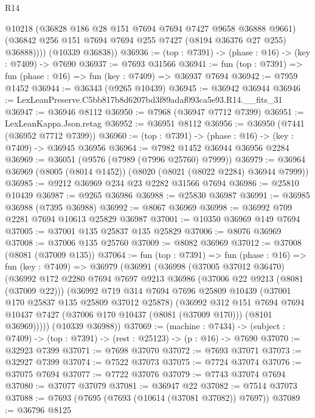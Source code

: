 \begin{lexlean}{R14}
\begin{coremodule}
            @10218
            (@36828 @186 @28 @151 @7694 @7694 @7427 @9658 @36888 @9661)
            (@36842 @256 @151 @7694 @7694 @255 @7427 (@8194 @36376 @27 @255) @36888))))
      (@10339 @36838))
@36936 := (top : @7391) -> (phase : @16) -> (key : @7409) -> @7690
@36937 := @7693 @31566
@36941 := fun (top : @7391) => fun (phase : @16) => fun (key : @7409) => @36937 @7694
@36942 := @7959 @1452
@36944 := @36343 (@9265 @10439)
@36945 := @36942 @36944
@36946 := LexLeanPreserve.C5bb817b8d6207bd3f89adaf093ca5e93.R14.__fits_31
@36947 := @36946 @8112
@36950 := @7968 (@36947 @7712 @7399)
@36951 := LexLeanKappa.Json.retag
@36952 := @36951 @8112
@36956 := @36950 (@7441 (@36952 @7712 @7399))
@36960 := (top : @7391) -> (phase : @16) -> (key : @7409) -> @36945 @36956
@36964 := @7982 @1452 @36944 @36956 @2284
@36969 := @36051 (@9576 (@7989 (@7996 @25760) @7999))
@36979 := @36964 @36969 (@8005 (@8014 @1452)) (@8020 (@8021 (@8022 @2284) @36944 @7999))
@36985 := @9212 @36969 @234 @23 @2282 @31566 @7694
@36986 := @25810 @10439
@36987 := @9265 @36986
@36988 := @25830 @36987
@36991 := @36985 @36988 (@7395 @36988)
@36992 := @8067 @36969
@36998 := @36992 @709 @2281 @7694 @10613 @25829 @36987
@37001 := @10350 @36969 @149 @7694
@37005 := @37001 @135 @25837 @135 @25829
@37006 := @8076 @36969
@37008 := @37006 @135 @25760
@37009 := @8082 @36969
@37012 := @37008 (@8081 (@37009 @135))
@37064 := fun (top : @7391) =>
  fun (phase : @16) =>
  fun (key : @7409) =>
  @36979
    (@36991
      (@36998
        (@37005 @37012 @36470)
        (@36992
          @172
          @2280
          @7694
          @7697
          @9213
          @36986
          (@37006 @22 @9213 (@8081 (@37009 @22)))
          (@36992
            @719
            @314
            @7694
            @7696
            @25809
            @10439
            (@37001 @170 @25837 @135 @25809 @37012 @25878)
            (@36992
              @312
              @151
              @7694
              @7694
              @10437
              @7427
              (@37006 @170 @10437 (@8081 (@37009 @170)))
              (@8101 @36969)))))
      (@10339 @36988))
@37069 := (machine : @7434) ->
  (subject : @7409) -> (top : @7391) -> (rest : @25123) -> (p : @16) -> @7690
@37070 := @32923 @7399
@37071 := @7698 @37070
@37072 := @7693 @37071
@37073 := @32927 @7399
@37074 := @7522 @37073
@37075 := @7724 @37074
@37076 := @37075 @7694
@37077 := @7722 @37076
@37079 := @7743 @37074 @7694
@37080 := @37077 @37079
@37081 := @36947 @22
@37082 := @7514 @37073
@37088 := @7693 (@7695 (@7693 (@10614 (@37081 @37082)) @7697))
@37089 := @36796 @8125

\end{coremodule}
\end{lexlean}
